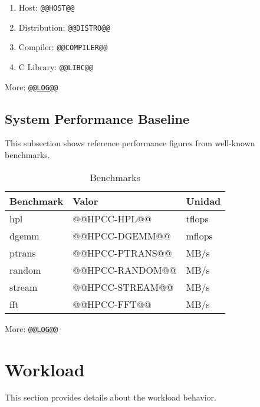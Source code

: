 \documentclass[a4paper, twocolumn]{article}
\begin{document}
\begin{enumerate}
\item Host: {\tt @@HOST@@}
\item Distribution: {\tt @@DISTRO@@}
\item Compiler: {\tt @@COMPILER@@}
\item C Library: {\tt @@LIBC@@}
\end{enumerate}

More: \href{TBD}{\tt @@LOG@@}

\subsection{System Performance Baseline}

This subsection shows reference performance figures from well-known benchmarks.

\begin{table}[H]
\caption{Benchmarks}
  \centering
    \begin{tabular}{|l|l|l|}\hline
      {\bf Benchmark} & {\bf Valor} & {\bf Unidad} \\ \hline
      hpl & @@HPCC-HPL@@ & tflops \\ \hline
      dgemm & @@HPCC-DGEMM@@ & mflops \\ \hline
      ptrans & @@HPCC-PTRANS@@ & MB/s \\ \hline
      random & @@HPCC-RANDOM@@ & MB/s \\ \hline
      stream & @@HPCC-STREAM@@ & MB/s \\ \hline
      fft & @@HPCC-FFT@@ & MB/s \\ \hline
    \end{tabular}
 \label{table:pruebas}
\end{table}

More: \href{TBD}{\tt @@LOG@@}

\section{Workload}

This section provides details about the workload behavior.
\end{document}
